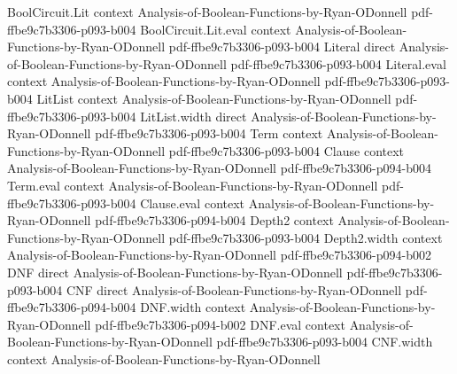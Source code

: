 \begin{theorem}
\leanok
{}
\proofstep
  {BoolCircuit.Lit}
  {context}
  {Analysis-of-Boolean-Functions-by-Ryan-ODonnell}
  {pdf-ffbe9c7b3306-p093-b004}
\proofstep
  {BoolCircuit.Lit.eval}
  {context}
  {Analysis-of-Boolean-Functions-by-Ryan-ODonnell}
  {pdf-ffbe9c7b3306-p093-b004}
\proofstep
  {Literal}
  {direct}
  {Analysis-of-Boolean-Functions-by-Ryan-ODonnell}
  {pdf-ffbe9c7b3306-p093-b004}
\proofstep
  {Literal.eval}
  {context}
  {Analysis-of-Boolean-Functions-by-Ryan-ODonnell}
  {pdf-ffbe9c7b3306-p093-b004}
\proofstep
  {LitList}
  {context}
  {Analysis-of-Boolean-Functions-by-Ryan-ODonnell}
  {pdf-ffbe9c7b3306-p093-b004}
\proofstep
  {LitList.width}
  {direct}
  {Analysis-of-Boolean-Functions-by-Ryan-ODonnell}
  {pdf-ffbe9c7b3306-p093-b004}
\proofstep
  {Term}
  {context}
  {Analysis-of-Boolean-Functions-by-Ryan-ODonnell}
  {pdf-ffbe9c7b3306-p093-b004}
\proofstep
  {Clause}
  {context}
  {Analysis-of-Boolean-Functions-by-Ryan-ODonnell}
  {pdf-ffbe9c7b3306-p094-b004}
\proofstep
  {Term.eval}
  {context}
  {Analysis-of-Boolean-Functions-by-Ryan-ODonnell}
  {pdf-ffbe9c7b3306-p093-b004}
\proofstep
  {Clause.eval}
  {context}
  {Analysis-of-Boolean-Functions-by-Ryan-ODonnell}
  {pdf-ffbe9c7b3306-p094-b004}
\proofstep
  {Depth2}
  {context}
  {Analysis-of-Boolean-Functions-by-Ryan-ODonnell}
  {pdf-ffbe9c7b3306-p093-b004}
\proofstep
  {Depth2.width}
  {context}
  {Analysis-of-Boolean-Functions-by-Ryan-ODonnell}
  {pdf-ffbe9c7b3306-p094-b002}
\proofstep
  {DNF}
  {direct}
  {Analysis-of-Boolean-Functions-by-Ryan-ODonnell}
  {pdf-ffbe9c7b3306-p093-b004}
\proofstep
  {CNF}
  {direct}
  {Analysis-of-Boolean-Functions-by-Ryan-ODonnell}
  {pdf-ffbe9c7b3306-p094-b004}
\proofstep
  {DNF.width}
  {context}
  {Analysis-of-Boolean-Functions-by-Ryan-ODonnell}
  {pdf-ffbe9c7b3306-p094-b002}
\proofstep
  {DNF.eval}
  {context}
  {Analysis-of-Boolean-Functions-by-Ryan-ODonnell}
  {pdf-ffbe9c7b3306-p093-b004}
\proofstep
  {CNF.width}
  {context}
  {Analysis-of-Boolean-Functions-by-Ryan-ODonnell}

\end{theorem}
